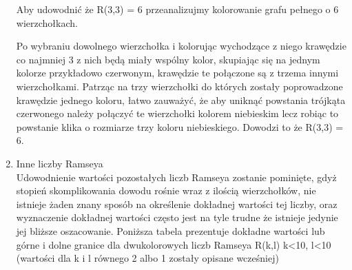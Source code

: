 \documentclass[11pt]{article}
\begin{document}
\begin{enumerate}
 

  
Aby udowodnić że R(3,3) = 6 przeanalizujmy kolorowanie grafu pełnego o 6 wierzchołkach. 
  
Po wybraniu dowolnego wierzchołka i kolorując wychodzące z niego krawędzie co najmniej 3 z nich będą miały wspólny kolor, skupiając się na jednym kolorze przykładowo czerwonym, krawędzie te połączone są z trzema innymi wierzchołkami. Patrząc na trzy wierzchołki do których zostały poprowadzone krawędzie jednego koloru, łatwo zauważyć, że aby uniknąć powstania trójkąta czerwonego należy połączyć te wierzchołki kolorem niebieskim lecz robiąc to powstanie klika o rozmiarze trzy koloru niebieskiego. Dowodzi to że R(3,3) = 6.
    



\item Inne liczby Ramseya \hfill \\

 Udowodnienie wartości pozostałych liczb Ramseya zostanie pominięte, gdyż stopień skomplikowania dowodu rośnie wraz z ilością wierzchołków, nie istnieje żaden znany sposób na określenie dokładnej wartości tej liczby, oraz wyznaczenie dokładnej wartości często jest na tyle trudne że istnieje jedynie jej bliższe oszacowanie. Poniższa tabela prezentuje dokładne wartości lub górne i dolne granice dla dwukolorowych liczb Ramseya R(k,l) k<10, l<10 (wartości dla k i l równego 2 albo 1 zostały opisane wcześniej)
 
\hfill 

\resizebox{\textwidth}{!}{%

}
\end{enumerate}
\end{document}
